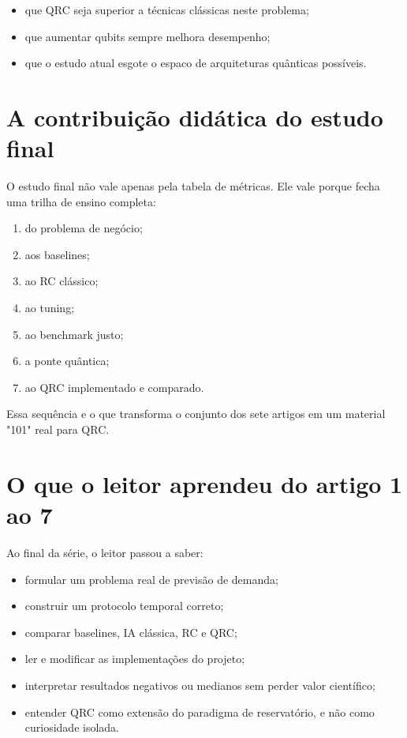 \documentclass[12pt]{article}
\providecommand{\tightlist}{%
              \setlength{\itemsep}{0pt}\setlength{\parskip}{0pt}}
\begin{document}
\begin{itemize}
\tightlist
\item
  que QRC seja superior a técnicas clássicas neste problema;
\item
  que aumentar qubits sempre melhora desempenho;
\item
  que o estudo atual esgote o espaco de arquiteturas quânticas possíveis.
\end{itemize}

\section{A contribuição didática do estudo final}\label{9-a-contribuiuxe7uxe3o-diduxe1tica-do-estudo-final}

O estudo final não vale apenas pela tabela de métricas. Ele vale porque fecha uma trilha de ensino completa:

\begin{enumerate}
\def\labelenumi{\arabic{enumi}.}
\tightlist
\item
  do problema de negócio;
\item
  aos baselines;
\item
  ao RC clássico;
\item
  ao tuning;
\item
  ao benchmark justo;
\item
  a ponte quântica;
\item
  ao QRC implementado e comparado.
\end{enumerate}

Essa sequência e o que transforma o conjunto dos sete artigos em um material "101" real para QRC.

\section{O que o leitor aprendeu do artigo 1 ao 7}\label{10-o-que-o-leitor-aprendeu-do-artigo-1-ao-7}

Ao final da série, o leitor passou a saber:

\begin{itemize}
\tightlist
\item
  formular um problema real de previsão de demanda;
\item
  construir um protocolo temporal correto;
\item
  comparar baselines, IA clássica, RC e QRC;
\item
  ler e modificar as implementações do projeto;
\item
  interpretar resultados negativos ou medianos sem perder valor científico;
\item
  entender QRC como extensão do paradigma de reservatório, e não como curiosidade isolada.
\end{itemize}
\end{document}
